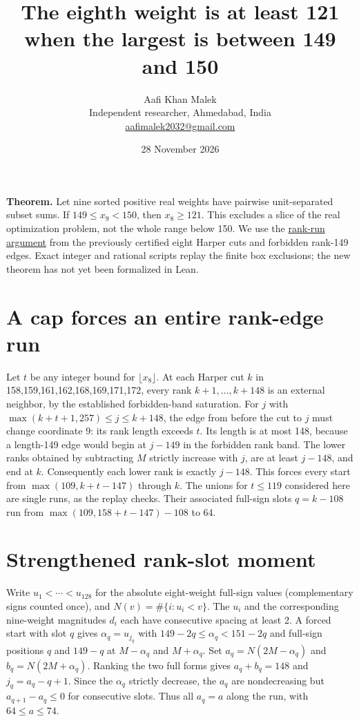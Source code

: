 \documentclass[11pt,letterpaper]{article}
\title{The eighth weight is at least 121 when the largest is between 149 and 150}
\author{Aafi Khan Malek\\ \small Independent researcher, Ahmedabad, India\\
\small\href{mailto:aafimalek2032@gmail.com}{aafimalek2032@gmail.com}}
\date{28 November 2026}
\begin{document}
\maketitle
\textbf{Theorem.} Let nine sorted positive real weights have pairwise
unit-separated subset sums. If \(149\le x_9<150\), then \(x_8\ge121\).
This excludes a slice of the real optimization problem, not the whole
range below 150. We use the
\href{https://github.com/Aafimalek/novel-discoveries/tree/4c5e61d8f6b55fa4fc9cf31aff871a1c0a6c4cc2/nine-separated-subset-sums/verification/rank-cuts-below-150/hall-rank-runs}{rank-run argument}
from the previously certified eight Harper cuts and forbidden rank-149
edges. Exact integer and rational scripts replay the finite box
exclusions; the new theorem has not yet been formalized in Lean.

\section{A cap forces an entire rank-edge
run}\label{a-cap-forces-an-entire-rank-edge-run}

Let \(t\) be any integer bound for \(\lfloor x_8\rfloor\). At each
Harper cut \(k\) in 158,159,161,162,168,169,171,172, every rank
\(k+1,\dots,k+148\) is an external neighbor, by the established
forbidden-band saturation. For \(j\) with
\(\max(k+t+1,257)\le j\le k+148\), the edge from before the cut to \(j\)
must change coordinate 9: its rank length exceeds \(t\). Its length is
at most 148, because a length-149 edge would begin at \(j-149\) in the
forbidden rank band. The lower ranks obtained by subtracting \(M\)
strictly increase with \(j\), are at least \(j-148\), and end at \(k\).
Consequently each lower rank is exactly \(j-148\). This forces every
start from \(\max(109,k+t-147)\) through \(k\). The unions for
\(t\le119\) considered here are single runs, as the replay checks. Their
associated full-sign slots \(q=k-108\) run from
\(\max(109,158+t-147)-108\) to 64.

\section{Strengthened rank-slot
moment}\label{strengthened-rank-slot-moment}

Write \(u_1<\cdots<u_{128}\) for the absolute eight-weight full-sign
values (complementary signs counted once), and \(N(v)=\#\{i:u_i<v\}\).
The \(u_i\) and the corresponding nine-weight magnitudes \(d_i\) each
have consecutive spacing at least 2. A forced start with slot \(q\)
gives \(\alpha_q=u_{j_q}\) with \(149-2q\le\alpha_q<151-2q\) and
full-sign positions \(q\) and \(149-q\) at \(M-\alpha_q\) and
\(M+\alpha_q\). Set \(a_q=N(2M-\alpha_q)\) and \(b_q=N(2M+\alpha_q)\).
Ranking the two full forms gives \(a_q+b_q=148\) and \(j_q=a_q-q+1\).
Since the \(\alpha_q\) strictly decrease, the \(a_q\) are nondecreasing
but \(a_{q+1}-a_q\le0\) for consecutive slots. Thus all \(a_q=a\) along
the run, with \(64\le a\le74\).
\end{document}
